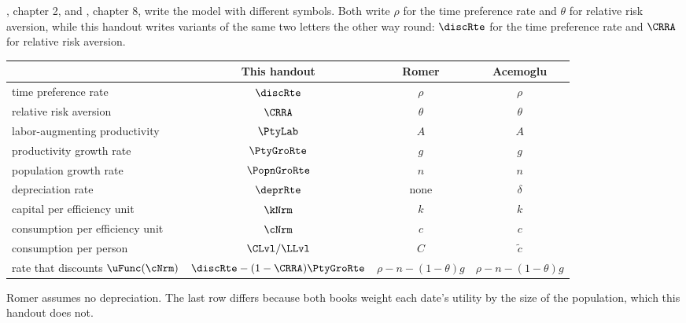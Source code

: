 \documentclass{econark}
\begin{document}
\citet{romer:text}, chapter 2, and \citet{acemogluGrowth}, chapter 8, write the model with different symbols. Both write $\rho$ for the time preference rate and $\theta$ for relative risk aversion, while this handout writes variants of the same two letters the other way round: $\discRte$ for the time preference rate and $\CRRA$ for relative risk aversion.

\begin{center}
\begin{tabular}{lccc}
                                         & This handout                         & Romer                       & Acemoglu            \\ \hline
  time preference rate                   & $\discRte$                           & $\rho$                      & $\rho$              \\
  relative risk aversion                 & $\CRRA$                              & $\theta$                    & $\theta$            \\
  labor-augmenting productivity          & $\PtyLab$                            & $A$                         & $A$                 \\
  productivity growth rate               & $\PtyGroRte$                         & $g$                         & $g$                 \\
  population growth rate                 & $\PopnGroRte$                        & $n$                         & $n$                 \\
  depreciation rate                      & $\deprRte$                           & none                        & $\delta$            \\
  capital per efficiency unit            & $\kNrm$                              & $k$                         & $k$                 \\
  consumption per efficiency unit        & $\cNrm$                              & $c$                         & $c$                 \\
  consumption per person                 & $\CLvl/\LLvl$                        & $C$                         & $\tilde{c}$         \\
  rate that discounts $\uFunc(\cNrm)$    & $\discRte-(1-\CRRA)\PtyGroRte$       & $\rho-n-(1-\theta)g$        & $\rho-n-(1-\theta)g$
\end{tabular}
\end{center}

Romer assumes no depreciation. The last row differs because both books weight each date's utility by the size of the population, which this handout does not.



\end{document}

